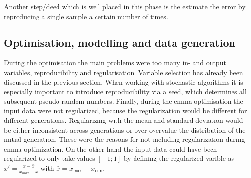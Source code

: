 Another step/deed which is well placed in this phase is the estimate the error by reproducing a single sample a certain number of times. 
%
\subsection{Optimisation, modelling and data generation}
\label{sec:phase3}
During the optimisation the main problems were too many in- and output variables, reproducibility and regularisation. 
Variable selection has already been discussed in the previous section. 
When working with stochastic algorithms it is especially important to introduce reproducibility via a seed, which determines all subsequent pseudo-random numbers. 
Finally, during the \gls{emma} optimisation the input data were not regularized, %
because the regularization would be different for different generations.
Regularizing with the mean and standard deviation would be either inconsistent across generations or over overvalue the distribution of the initial generation. 
%
These were the reasons for not including regularization during \gls{emma} optimization. 
On the other hand the input data could have been regularized to only take values $[-1;1]$ by defining the regularized varible as 
$x'= \frac{x-\bar{x}}{x_{max} - \bar{x}}$ with $\bar{x}= x_{\text{max}} - x_{\text{min}}$.
\iffalse
\begin{itemize}
    \item regularization
    \item reproducability (random in code and repeat sample)
    \item main problems too many in and output vars
\end{itemize}
\fi
\iffalse
